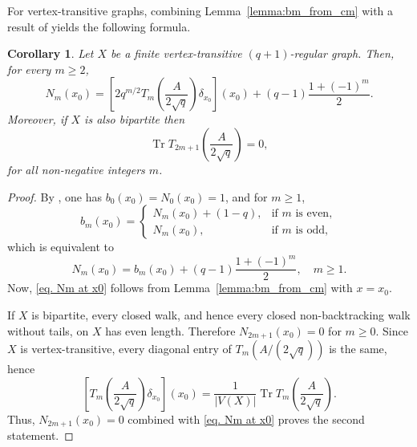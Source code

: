 \documentclass[reqno,10pt]{amsart}
\newtheorem{corollary}[theorem]{Corollary}
\theoremstyle{definition}
\numberwithin{equation}{section}
\begin{document}
For vertex-transitive graphs, combining Lemma~\ref{lemma:bm_from_cm} with a result
of \cite{CHJSV} yields the following formula.

\begin{corollary}\label{cor:Nm_from_bm}
Let $X$ be a finite vertex-transitive $(q+1)$-regular graph. Then, for every
$m\ge2$,
\begin{equation}\label{eq. Nm at x0}
N_m(x_0)
=
\left[
2q^{m/2}
T_m\!\left(\frac{A}{2\sqrt q}\right) \delta_{x_0}
\right](x_0)
+
(q-1)\frac{1+(-1)^m}{2}.
\end{equation}
Moreover, if $X$ is also bipartite then
\[
\operatorname{Tr}
T_{2m+1}\!\left(\frac{A}{2\sqrt q}\right)=0,
\]
for all non-negative integers $m$.
\end{corollary}

\begin{proof}
By \cite[Lemma~2.3(3)]{CHJSV}, one has $b_0(x_0)=N_0(x_0)=1$, and for $m\ge1$,
\begin{equation}\label{eq:relation_b_m}
b_m(x_0) =
\begin{cases}
    N_m(x_0) + (1 - q), & \text{if $m$ is even}, \\
    N_m(x_0), & \text{if $m$ is odd},
\end{cases}
\end{equation}
which is equivalent to
\[
N_m(x_0)
=
b_m(x_0)
+
(q-1)\frac{1+(-1)^m}{2},\quad m\geq 1.
\]
Now, \eqref{eq. Nm at x0} follows from Lemma~\ref{lemma:bm_from_cm} with $x=x_0$.

If $X$ is bipartite, every closed walk, and hence every closed non-backtracking walk without tails, on $X$ has
even length. Therefore $N_{2m+1}(x_0)=0$ for $m\ge0$. Since $X$ is vertex-transitive, every diagonal entry of
$T_m(A/(2\sqrt q))$ is the same, hence
\begin{equation}\label{eq. trace mnev}
\left[T_m\!\left(\frac{A}{2\sqrt q}\right)\delta_{x_0}\right](x_0)
=
\frac1{|V(X)|}
\operatorname{Tr}
T_m\!\left(\frac{A}{2\sqrt q}\right).
\end{equation}
Thus,  $N_{2m+1}(x_0)=0$ combined with \eqref{eq. Nm at x0} proves the second statement.
\end{proof}
\end{document}
